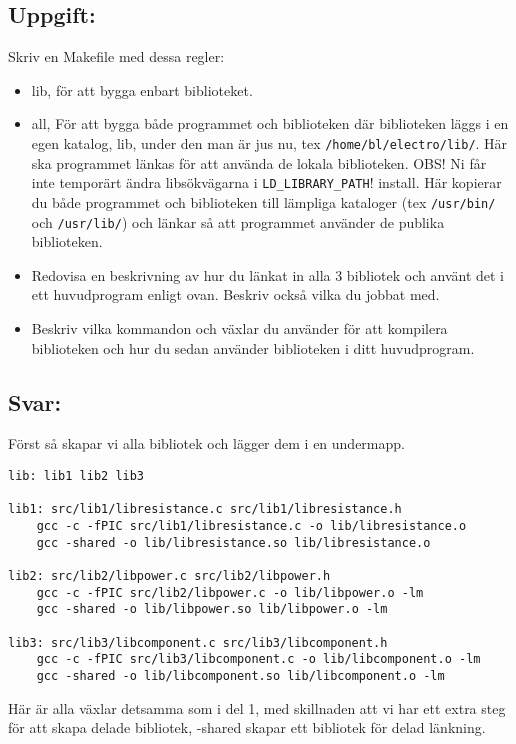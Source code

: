 \documentclass[10pt, a4paper]{article}
\begin{document}
\subsection*{Uppgift:}
Skriv en Makefile med dessa regler:
\begin{itemize}
\item lib, för att bygga enbart biblioteket.
\item all, För att bygga både programmet och biblioteken där biblioteken läggs i en egen katalog, lib,  under den man är jus nu, tex \verb#/home/bl/electro/lib/#. Här ska programmet länkas för att använda de lokala biblioteken. OBS! Ni får inte temporärt ändra libsökvägarna i \verb#LD_LIBRARY_PATH#!
install. Här kopierar du både programmet och biblioteken till lämpliga kataloger (tex \verb#/usr/bin/# och \verb#/usr/lib/#) och länkar så att programmet använder de publika biblioteken.
\item Redovisa en beskrivning av hur du länkat in alla 3 bibliotek och använt det i ett huvudprogram enligt ovan. Beskriv också vilka du jobbat med.

\item Beskriv vilka kommandon och växlar du använder för att kompilera biblioteken och hur du sedan använder biblioteken i ditt huvudprogram.
\end{itemize}
\subsection*{Svar:}

 Först så skapar vi alla bibliotek och lägger dem i en undermapp.
\begin{verbatim}
lib: lib1 lib2 lib3

lib1: src/lib1/libresistance.c src/lib1/libresistance.h
    gcc -c -fPIC src/lib1/libresistance.c -o lib/libresistance.o
    gcc -shared -o lib/libresistance.so lib/libresistance.o

lib2: src/lib2/libpower.c src/lib2/libpower.h 
    gcc -c -fPIC src/lib2/libpower.c -o lib/libpower.o -lm
    gcc -shared -o lib/libpower.so lib/libpower.o -lm

lib3: src/lib3/libcomponent.c src/lib3/libcomponent.h 
    gcc -c -fPIC src/lib3/libcomponent.c -o lib/libcomponent.o -lm
    gcc -shared -o lib/libcomponent.so lib/libcomponent.o -lm
\end{verbatim}
Här är alla växlar detsamma som i del 1, med skillnaden att vi har ett extra steg för att skapa delade bibliotek, -shared skapar ett bibliotek för delad länkning.
\end{document}
